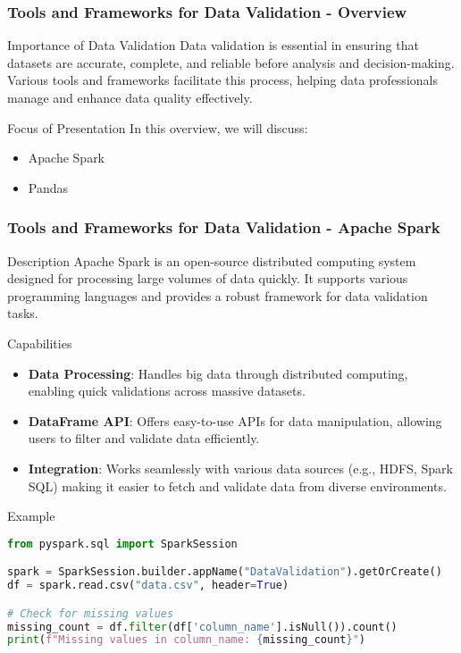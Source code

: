\documentclass[aspectratio=169]{beamer}
\begin{document}
\begin{frame}[fragile]
    \frametitle{Tools and Frameworks for Data Validation - Overview}
    \begin{block}{Importance of Data Validation}
        Data validation is essential in ensuring that datasets are accurate, complete, and reliable before analysis and decision-making. Various tools and frameworks facilitate this process, helping data professionals manage and enhance data quality effectively.
    \end{block}
    \begin{block}{Focus of Presentation}
        In this overview, we will discuss:
        \begin{itemize}
            \item Apache Spark
            \item Pandas
        \end{itemize}
    \end{block}
\end{frame}

\begin{frame}[fragile]
    \frametitle{Tools and Frameworks for Data Validation - Apache Spark}
    \begin{block}{Description}
        Apache Spark is an open-source distributed computing system designed for processing large volumes of data quickly. It supports various programming languages and provides a robust framework for data validation tasks.
    \end{block}
    \begin{block}{Capabilities}
        \begin{itemize}
            \item \textbf{Data Processing}: Handles big data through distributed computing, enabling quick validations across massive datasets.
            \item \textbf{DataFrame API}: Offers easy-to-use APIs for data manipulation, allowing users to filter and validate data efficiently.
            \item \textbf{Integration}: Works seamlessly with various data sources (e.g., HDFS, Spark SQL) making it easier to fetch and validate data from diverse environments.
        \end{itemize}
    \end{block}
    \begin{block}{Example}
        \begin{lstlisting}[language=Python, basicstyle=\footnotesize]
from pyspark.sql import SparkSession

spark = SparkSession.builder.appName("DataValidation").getOrCreate()
df = spark.read.csv("data.csv", header=True)

# Check for missing values
missing_count = df.filter(df['column_name'].isNull()).count()
print(f"Missing values in column_name: {missing_count}")
        \end{lstlisting}
    \end{block}
\end{frame}
\end{document}
